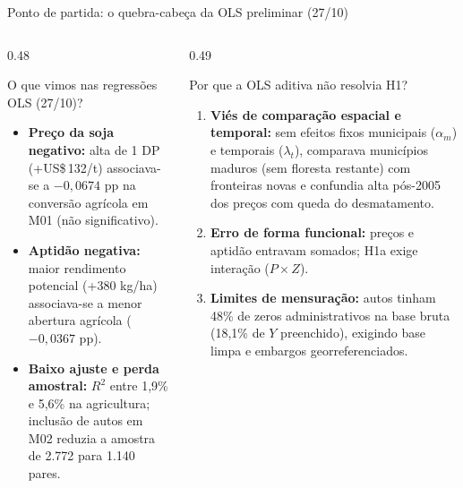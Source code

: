 \documentclass[aspectratio=169,10.5pt]{beamer}
\newcommand{\fonte}[1]{\par\vspace{1mm}{\fontsize{6.5}{7.5}\selectfont\color{gray}Fonte: #1\par}}
\newcommand{\est}[2]{\ensuremath{#1}\;{\color{gray}\fontsize{7}{8}\selectfont(#2)}}
\begin{document}
\begin{frame}{Ponto de partida: o quebra-cabeça da OLS preliminar (27/10)}
\begin{columns}[T]
\begin{column}{0.48\textwidth}
\begin{block}{O que vimos nas regressões OLS (27/10)?}
\fontsize{8.2}{10}\selectfont
\begin{itemize}
    \setlength{\itemsep}{1.1mm}
    \item \textbf{Preço da soja negativo:} alta de 1 DP (+US\$\,132/t) associava-se a \est{-0{,}0674}{0{,}0667} pp na conversão agrícola em M01 (não significativo).
    \item \textbf{Aptidão negativa:} maior rendimento potencial (+380 kg/ha) associava-se a menor abertura agrícola (\est{-0{,}0367}{0{,}0222} pp).
    \item \textbf{Baixo ajuste e perda amostral:} $R^2$ entre 1,9\% e 5,6\% na agricultura; inclusão de autos em M02 reduzia a amostra de 2.772 para 1.140 pares.
\end{itemize}
\end{block}
\end{column}

\begin{column}{0.49\textwidth}
\begin{block}{Por que a OLS aditiva não resolvia H1?}
\fontsize{8.2}{10}\selectfont
\begin{enumerate}
    \setlength{\itemsep}{1.1mm}
    \item \textbf{Viés de comparação espacial e temporal:} sem efeitos fixos municipais ($\alpha_m$) e temporais ($\lambda_t$), comparava municípios maduros (sem floresta restante) com fronteiras novas e confundia alta pós-2005 dos preços com queda do desmatamento.
    \item \textbf{Erro de forma funcional:} preços e aptidão entravam somados; H1a exige interação ($P \times Z$).
    \item \textbf{Limites de mensuração:} autos tinham 48\% de zeros administrativos na base bruta (18,1\% de $Y$ preenchido), exigindo base limpa e embargos georreferenciados.
\end{enumerate}
\end{block}
\end{column}
\end{columns}
\end{frame}
\end{document}
